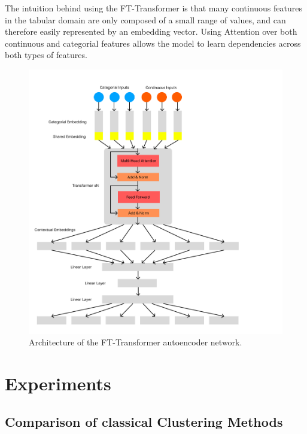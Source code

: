 The intuition behind using the FT-Transformer is that many continuous features in the tabular domain are only composed of a small range of values, and can therefore easily represented by an embedding vector. Using Attention over both continuous and categorial features allows the model to learn dependencies across both types of features.

\begin{figure}
	\includegraphics[width=1.2\linewidth]{ft_transformer_autoencoder.png}
	\caption{Architecture of the FT-Transformer autoencoder network.}
	\label{ft_transformer_autoencoder}
\end{figure}




\chapter{Experiments} \label{Experiments}

\section{Comparison of classical Clustering Methods}

